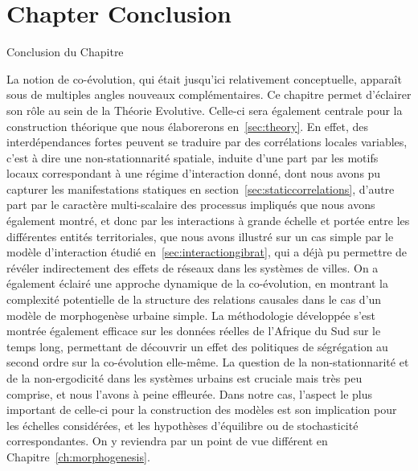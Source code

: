 




\newpage


\section*{Chapter Conclusion}{Conclusion du Chapitre}


La notion de co-évolution, qui était jusqu'ici relativement conceptuelle, apparaît sous de multiples angles nouveaux complémentaires. Ce chapitre permet d'éclairer son rôle au sein de la Théorie Evolutive.%
 Celle-ci sera également centrale pour la construction théorique que nous élaborerons en~\ref{sec:theory}. En effet, des interdépendances fortes peuvent se traduire par des corrélations locales variables, c'est à dire une non-stationnarité spatiale, induite d'une part par les motifs locaux correspondant à une régime d'interaction donné, dont nous avons pu capturer les manifestations statiques en section~\ref{sec:staticcorrelations}, d'autre part par le caractère multi-scalaire des processus impliqués que nous avons également montré, et donc par les interactions à grande échelle et portée entre les différentes entités territoriales, que nous avons illustré sur un cas simple par le modèle d'interaction étudié en~\ref{sec:interactiongibrat}, qui a déjà pu permettre de révéler indirectement des effets de réseaux dans les systèmes de villes. On a également éclairé une approche dynamique de la co-évolution, en montrant la complexité potentielle de la structure des relations causales dans le cas d'un modèle de morphogenèse urbaine simple. La méthodologie développée s'est montrée également efficace sur les données réelles de l'Afrique du Sud sur le temps long, permettant de découvrir un effet des politiques de ségrégation au second ordre sur la co-évolution elle-même. La question de la non-stationnarité et de la non-ergodicité dans les systèmes urbains est cruciale mais très peu comprise, et nous l'avons à peine effleurée. Dans notre cas, l'aspect le plus important de celle-ci pour la construction des modèles est son implication pour les échelles considérées, et les hypothèses d'équilibre ou de stochasticité correspondantes. On y reviendra par un point de vue différent en Chapitre~\ref{ch:morphogenesis}.



\stars

